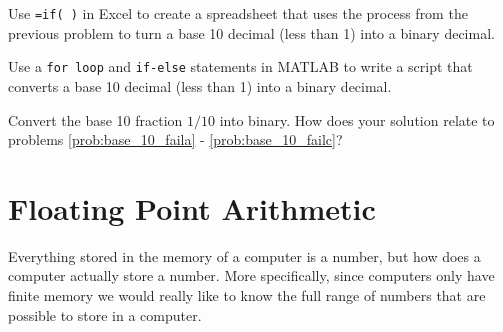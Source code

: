 \begin{problem}
    Use \texttt{=if( )} in Excel to create a spreadsheet that uses the process from the
    previous problem to turn a base 10 decimal (less than 1) into a binary decimal.
\end{problem}

\begin{problem}
    Use a \texttt{for loop} and \texttt{if-else} statements in MATLAB to write a script
    that converts a base 10 decimal (less than 1) into a binary decimal.
\end{problem}

\begin{problem}
    Convert the base 10 fraction $1/10$ into binary.  How does your solution relate to
    problems \ref{prob:base_10_faila} - \ref{prob:base_10_failc}?
\end{problem}



\section{Floating Point Arithmetic}
Everything stored in the memory of a computer is a number, but how does a computer
actually store a number.  More specifically, since computers only have finite memory we
would really like to know the full range of numbers that are possible to store in a
computer.  

